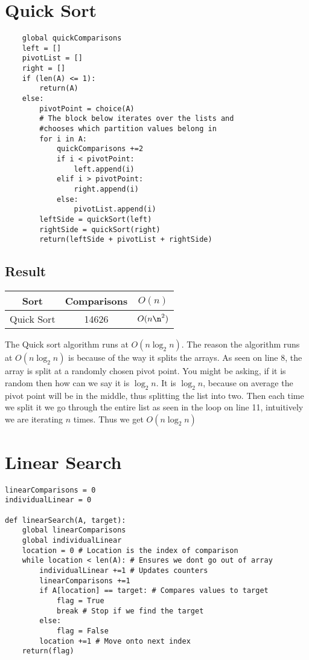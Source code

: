 \documentclass{article}
\begin{document}
\newpage

\section{Quick Sort}
\label{Quick Sort}
\begin{lstlisting}
    global quickComparisons
    left = []
    pivotList = []
    right = []
    if (len(A) <= 1):
        return(A)
    else:
        pivotPoint = choice(A)
        # The block below iterates over the lists and 
        #chooses which partition values belong in
        for i in A:
            quickComparisons +=2
            if i < pivotPoint:
                left.append(i)
            elif i > pivotPoint:
                right.append(i)
            else:
                pivotList.append(i)
        leftSide = quickSort(left)
        rightSide = quickSort(right)
        return(leftSide + pivotList + rightSide)
\end{lstlisting}
\subsection{Result}
\begin{tabular}{c|c|c}
    Sort & Comparisons & $O(n)$ \\
\hline
    Quick Sort & 14626 & $O(n\n^2)$
\end{tabular}
\vspace{5mm}

The Quick sort algorithm runs at $O(n \log_2 n)$. The reason the algorithm runs at $O(n \log_2 n)$ is because of the way it splits the arrays. As seen on line 8, the array is split at a randomly chosen pivot point. You might be asking, if it is random then how can we say it is $\log_2n$. It is $\log_2n$, because on average the pivot point will be in the middle, thus splitting the list into two. Then each time we split it we go through the entire list as seen in the loop on line 11, intuitively we are iterating $n$ times. Thus we get $O(n \log_2n)$



\newpage

\section{Linear Search}
\label{Linear Search}
\begin{lstlisting}
linearComparisons = 0
individualLinear = 0

def linearSearch(A, target):
    global linearComparisons
    global individualLinear
    location = 0 # Location is the index of comparison
    while location < len(A): # Ensures we dont go out of array
        individualLinear +=1 # Updates counters
        linearComparisons +=1
        if A[location] == target: # Compares values to target
            flag = True
            break # Stop if we find the target
        else:
            flag = False
        location +=1 # Move onto next index
    return(flag)
\end{lstlisting}
\end{document}
